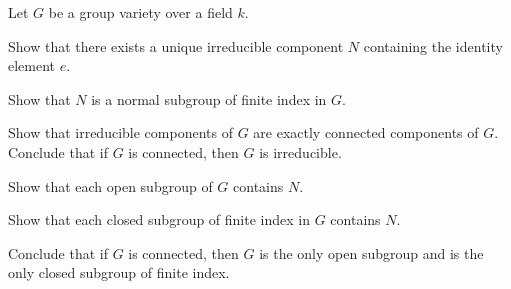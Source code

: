 \documentclass[../notes.tex]{subfiles}
\begin{document}
\begin{prob}
	Let $G$ be a group variety over a field $k$.
    \begin{listalph}
        \item Show that there exists a unique irreducible component $N$ containing the identity element $e$. 
        \item Show that $N$ is a normal subgroup of finite index in $G$.
        \item Show that irreducible components of $G$ are exactly connected components of $G$. Conclude that if $G$ is connected, then $G$ is irreducible.
        \item Show that each open subgroup of $G$ contains $N$.
        \item Show that each closed subgroup of finite index in $G$ contains $N$.
        \item Conclude that if $G$ is connected, then $G$ is the only open subgroup and is the only closed subgroup of finite index.
    \end{listalph}
\end{prob}
\end{document}
